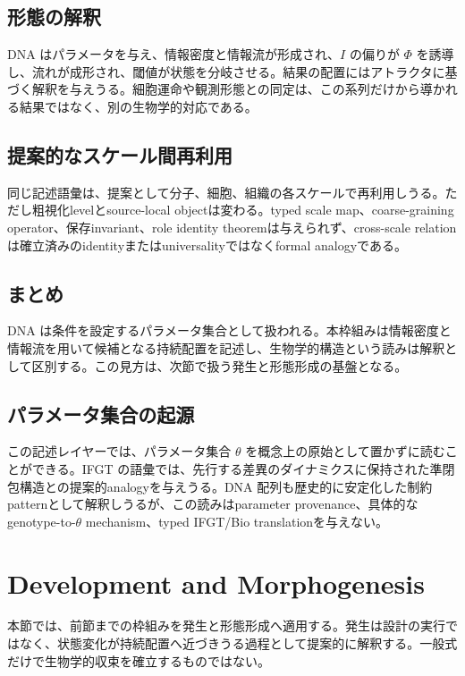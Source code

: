 \documentclass[11pt]{ltjsarticle}
\newcommand{\I}{I}
\newcommand{\PhiI}{\Phi}
\begin{document}
\subsection{形態の解釈}

DNA はパラメータを与え、情報密度と情報流が形成され、\(\I\) の偏りが \(\PhiI\) を誘導し、流れが成形され、閾値が状態を分岐させる。結果の配置にはアトラクタに基づく解釈を与えうる。細胞運命や観測形態との同定は、この系列だけから導かれる結果ではなく、別の生物学的対応である。

\subsection{提案的なスケール間再利用}

同じ記述語彙は、提案として分子、細胞、組織の各スケールで再利用しうる。ただし粗視化levelとsource-local objectは変わる。typed scale map、coarse-graining operator、保存invariant、role identity theoremは与えられず、cross-scale relationは確立済みのidentityまたはuniversalityではなくformal analogyである。

\subsection{まとめ}

DNA は条件を設定するパラメータ集合として扱われる。本枠組みは情報密度と情報流を用いて候補となる持続配置を記述し、生物学的構造という読みは解釈として区別する。この見方は、次節で扱う発生と形態形成の基盤となる。

\subsection{パラメータ集合の起源}

この記述レイヤーでは、パラメータ集合 \(\theta\) を概念上の原始として置かずに読むことができる。IFGT の語彙では、先行する差異のダイナミクスに保持された準閉包構造との提案的analogyを与えうる。DNA 配列も歴史的に安定化した制約patternとして解釈しうるが、この読みはparameter provenance、具体的なgenotype-to-\(\theta\) mechanism、typed IFGT/Bio translationを与えない。

\section{Development and Morphogenesis}

本節では、前節までの枠組みを発生と形態形成へ適用する。発生は設計の実行ではなく、状態変化が持続配置へ近づきうる過程として提案的に解釈する。一般式だけで生物学的収束を確立するものではない。
\end{document}

